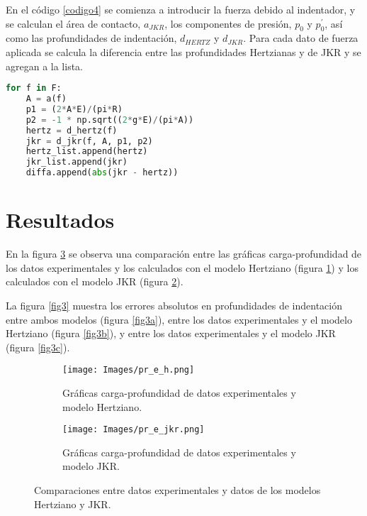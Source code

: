 \documentclass[final,6p,times,twocolumn]{elsarticle}
\begin{document}
En el c\'odigo \ref{codigo4} se comienza a introducir la fuerza debido al indentador, y se calculan el \'area de contacto, $a_{JKR}$, los componentes de presi\'on, $p_0$ y $p^\prime_0$, as\'i como las profundidades de indentaci\'on, $d_{HERTZ}$ y $d_{JKR}$. Para cada dato de fuerza aplicada se calcula la diferencia entre las profundidades Hertzianas y de JKR y se agregan a la lista.

\begin{lstlisting}[caption=Implementaci\'on de Modelos Matem\'aticos, label=codigo4, language=Python]
for f in F:
    A = a(f)
    p1 = (2*A*E)/(pi*R)
    p2 = -1 * np.sqrt((2*g*E)/(pi*A))
    hertz = d_hertz(f)
    jkr = d_jkr(f, A, p1, p2)
    hertz_list.append(hertz)
    jkr_list.append(jkr)
    diffa.append(abs(jkr - hertz))
\end{lstlisting}

\section{Resultados}
En la figura \ref{fig2} se observa una comparaci\'on entre las gr\'aficas carga-profundidad de los datos experimentales y los calculados con el modelo Hertziano (figura \ref{fig2a}) y los calculados con el modelo JKR (figura \ref{fig2b}).

La figura \ref{fig3} muestra los errores absolutos en profundidades de indentaci\'on entre ambos modelos (figura \ref{fig3a}), entre los datos experimentales y el modelo Hertziano (figura \ref{fig3b}), y entre los datos experimentales y el modelo JKR (figura \ref{fig3c}).

\begin{figure}
\centering
    \begin{subfigure}[t]{0.49\textwidth}
         \centering
         \texttt{[image: Images/pr\_e\_h.png]}
         \caption{Gr\'aficas carga-profundidad de datos experimentales y modelo Hertziano.}
         \label{fig2a}
     \end{subfigure}
     \begin{subfigure}[t]{0.49\textwidth}
         \centering
         \texttt{[image: Images/pr\_e\_jkr.png]}
         \caption{Gr\'aficas carga-profundidad de datos experimentales y modelo JKR.}
         \label{fig2b}
     \end{subfigure}
    \caption{Comparaciones entre datos experimentales y datos de los modelos Hertziano y JKR.}
    \label{fig2}
\end{figure}
\end{document}
